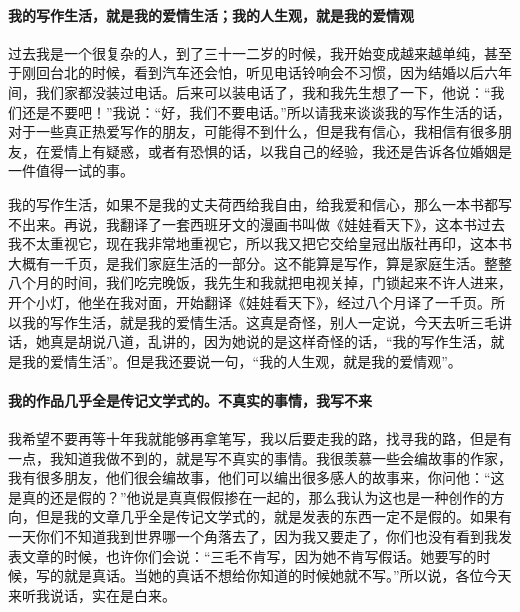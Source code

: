 \paragraph*{我的写作生活，就是我的爱情生活；我的人生观，就是我的爱情观}
\par 过去我是一个很复杂的人，到了三十一二岁的时候，我开始变成越来越单纯，甚至于刚回台北的时候，看到汽车还会怕，听见电话铃响会不习惯，因为结婚以后六年间，我们家都没装过电话。后来可以装电话了，我和我先生想了一下，他说：“我们还是不要吧！”我说：“好，我们不要电话。”所以请我来谈谈我的写作生活的话，对于一些真正热爱写作的朋友，可能得不到什么，但是我有信心，我相信有很多朋友，在爱情上有疑惑，或者有恐惧的话，以我自己的经验，我还是告诉各位婚姻是一件值得一试的事。
\par 我的写作生活，如果不是我的丈夫荷西给我自由，给我爱和信心，那么一本书都写不出来。再说，我翻译了一套西班牙文的漫画书叫做《娃娃看天下》，这本书过去我不太重视它，现在我非常地重视它，所以我又把它交给皇冠出版社再印，这本书大概有一千页，是我们家庭生活的一部分。这不能算是写作，算是家庭生活。整整八个月的时间，我们吃完晚饭，我先生和我就把电视关掉，门锁起来不许人进来，开个小灯，他坐在我对面，开始翻译《娃娃看天下》，经过八个月译了一千页。所以我的写作生活，就是我的爱情生活。这真是奇怪，别人一定说，今天去听三毛讲话，她真是胡说八道，乱讲的，因为她说的是这样奇怪的话，“我的写作生活，就是我的爱情生活”。但是我还要说一句，“我的人生观，就是我的爱情观”。

\paragraph*{我的作品几乎全是传记文学式的。不真实的事情，我写不来}
\par 我希望不要再等十年我就能够再拿笔写，我以后要走我的路，找寻我的路，但是有一点，我知道我做不到的，就是写不真实的事情。我很羡慕一些会编故事的作家，我有很多朋友，他们很会编故事，他们可以编出很多感人的故事来，你问他：“这是真的还是假的？”他说是真真假假掺在一起的，那么我认为这也是一种创作的方向，但是我的文章几乎全是传记文学式的，就是发表的东西一定不是假的。如果有一天你们不知道我到世界哪一个角落去了，因为我又要走了，你们也没有看到我发表文章的时候，也许你们会说：“三毛不肯写，因为她不肯写假话。她要写的时候，写的就是真话。当她的真话不想给你知道的时候她就不写。”所以说，各位今天来听我说话，实在是白来。

